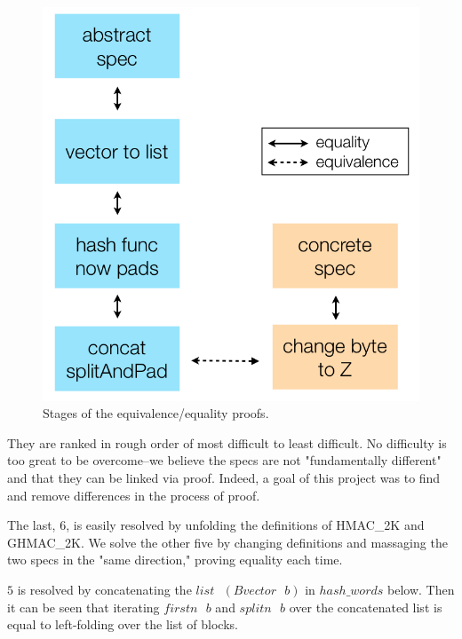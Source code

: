 \documentclass[twocolumn,showpacs,%
  nofootinbib,aps,superscriptaddress,%
  eqsecnum,prd,notitlepage,showkeys,10pt]{revtex4-1}
\newcommand{\s} {\textrm{ }}
\begin{document}
\begin{figure}[h!]
	\centering
	\includegraphics[scale=0.56]{Equivalence_proof_chain}
	\caption{Stages of the equivalence/equality proofs.}
\end{figure}

They are ranked in rough order of most difficult to least difficult. No difficulty is too great to be overcome--we believe the specs are not "fundamentally different" and that they can be linked via proof. Indeed, a goal of this project was to find and remove differences in the process of proof.

The last, $6$, is easily resolved by unfolding the definitions of HMAC\_2K and GHMAC\_2K. We solve the other five by changing definitions and massaging the two specs in the "same direction," proving equality each time.

$5$ is resolved by concatenating the $list \s(Bvector \s b)$ in $hash\_words$ below. Then it can be seen that iterating $firstn \s b$ and $splitn \s b$ over the concatenated list is equal to left-folding over the list of blocks.




\end{document}
